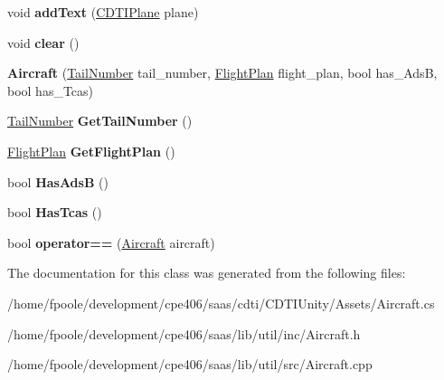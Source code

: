 \begin{DoxyCompactItemize}
\item 
\hypertarget{class_aircraft_a5d0a7f6d13ba1c554344a8721f9b63d8}{}void {\bfseries add\+Text} (\hyperlink{class_example_1_1_c_d_t_i_plane}{C\+D\+T\+I\+Plane} plane)\label{class_aircraft_a5d0a7f6d13ba1c554344a8721f9b63d8}

\item 
\hypertarget{class_aircraft_a2cf11d3ba7b55539f2425ecdbb356f9d}{}void {\bfseries clear} ()\label{class_aircraft_a2cf11d3ba7b55539f2425ecdbb356f9d}

\item 
\hypertarget{class_aircraft_a32bd6ccc41f0b5228ee40e53e26a7d26}{}{\bfseries Aircraft} (\hyperlink{class_tail_number}{Tail\+Number} tail\+\_\+number, \hyperlink{class_flight_plan}{Flight\+Plan} flight\+\_\+plan, bool has\+\_\+\+Ads\+B, bool has\+\_\+\+Tcas)\label{class_aircraft_a32bd6ccc41f0b5228ee40e53e26a7d26}

\item 
\hypertarget{class_aircraft_a873fa8eb5ba2d18b20a4287987891cd8}{}\hyperlink{class_tail_number}{Tail\+Number} {\bfseries Get\+Tail\+Number} ()\label{class_aircraft_a873fa8eb5ba2d18b20a4287987891cd8}

\item 
\hypertarget{class_aircraft_ade840a0a16e3e97e0f6c360eb4a462cc}{}\hyperlink{class_flight_plan}{Flight\+Plan} {\bfseries Get\+Flight\+Plan} ()\label{class_aircraft_ade840a0a16e3e97e0f6c360eb4a462cc}

\item 
\hypertarget{class_aircraft_a265f79cb326d10f54a7fa7cee9e05823}{}bool {\bfseries Has\+Ads\+B} ()\label{class_aircraft_a265f79cb326d10f54a7fa7cee9e05823}

\item 
\hypertarget{class_aircraft_a83e16a46d82d3ce0bf56b6ef92eb5068}{}bool {\bfseries Has\+Tcas} ()\label{class_aircraft_a83e16a46d82d3ce0bf56b6ef92eb5068}

\item 
\hypertarget{class_aircraft_a4e83ec8b0eabff38ee884a29bc003723}{}bool {\bfseries operator==} (\hyperlink{class_aircraft}{Aircraft} aircraft)\label{class_aircraft_a4e83ec8b0eabff38ee884a29bc003723}

\end{DoxyCompactItemize}


The documentation for this class was generated from the following files\+:\begin{DoxyCompactItemize}
\item 
/home/fpoole/development/cpe406/saas/cdti/\+C\+D\+T\+I\+Unity/\+Assets/Aircraft.\+cs\item 
/home/fpoole/development/cpe406/saas/lib/util/inc/Aircraft.\+h\item 
/home/fpoole/development/cpe406/saas/lib/util/src/Aircraft.\+cpp\end{DoxyCompactItemize}

